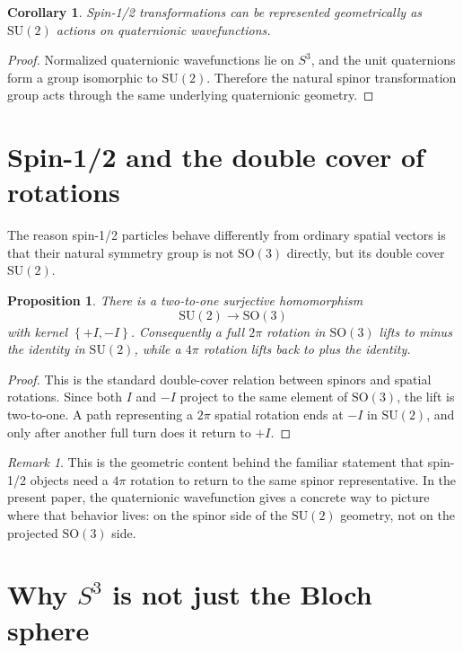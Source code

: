 \documentclass[11pt]{article}
\newtheorem{proposition}[definition]{Proposition}
\newtheorem{corollary}[definition]{Corollary}
\theoremstyle{remark}
\newtheorem{remark}[definition]{Remark}
\newcommand{\SU}{\mathrm{SU}}
\newcommand{\SO}{\mathrm{SO}}
\newcommand{\Id}{I}
\newcommand{\set}[1]{\left\{ #1 \right\}}
\begin{document}
\begin{corollary}
Spin-1/2 transformations can be represented geometrically as $\SU(2)$ actions on quaternionic wavefunctions.
\end{corollary}

\begin{proof}
Normalized quaternionic wavefunctions lie on $S^3$, and the unit quaternions form a group isomorphic to $\SU(2)$. Therefore the natural spinor transformation group acts through the same underlying quaternionic geometry.
\end{proof}

\section{Spin-1/2 and the double cover of rotations}

The reason spin-1/2 particles behave differently from ordinary spatial vectors is that their natural symmetry group is not $\SO(3)$ directly, but its double cover $\SU(2)$.

\begin{proposition}
There is a two-to-one surjective homomorphism
\[
\SU(2) \to \SO(3)
\]
with kernel $\set{+\Id,-\Id}$. Consequently a full $2\pi$ rotation in $\SO(3)$ lifts to minus the identity in $\SU(2)$, while a $4\pi$ rotation lifts back to plus the identity.
\end{proposition}

\begin{proof}
This is the standard double-cover relation between spinors and spatial rotations. Since both $\Id$ and $-\Id$ project to the same element of $\SO(3)$, the lift is two-to-one. A path representing a $2\pi$ spatial rotation ends at $-\Id$ in $\SU(2)$, and only after another full turn does it return to $+\Id$.
\end{proof}

\begin{remark}
This is the geometric content behind the familiar statement that spin-1/2 objects need a $4\pi$ rotation to return to the same spinor representative. In the present paper, the quaternionic wavefunction gives a concrete way to picture where that behavior lives: on the spinor side of the $\SU(2)$ geometry, not on the projected $\SO(3)$ side.
\end{remark}

\section{Why \texorpdfstring{$S^3$}{S3} is not just the Bloch sphere}
\end{document}
